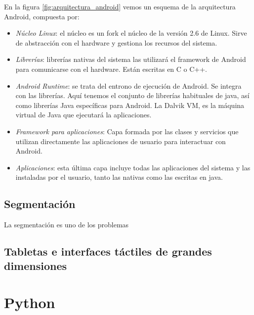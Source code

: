 En la figura \ref{fig:arquitectura_android} vemos un esquema de la arquitectura Android, compuesta por:
\begin{itemize}
\item \emph{Núcleo Linux}: el núcleo es un fork el núcleo de la versión 2.6 de Linux. Sirve de abstracción con el hardware y gestiona los recursos del sistema. 
\item \emph{Librerías}: librerías nativas del sistema las utilizará el framework de Android para comunicarse con el hardware. Están escritas en C o C++.
\item \emph{Android Runtime}: se trata del entrono de ejecución de Android. Se integra con las librerías. Aquí tenemos el conjunto de librerías habituales de java, así como librerías Java específicas para Android. La Dalvik VM, es la máquina virtual de Java que ejecutará la aplicaciones. 
\item \emph{Framework para aplicaciones}: Capa formada por las clases y servicios que utilizan directamente las aplicaciones de usuario para interactuar con Android. 
\item \emph{Aplicaciones}: esta última capa incluye todas las aplicaciones del sistema y las instaladas por el usuario, tanto las nativas como las escritas en java.

\end{itemize}




\subsection{Segmentación}
La segmentación es uno de los problemas 


\subsection{Tabletas e interfaces táctiles de grandes dimensiones}

\section{Python}
